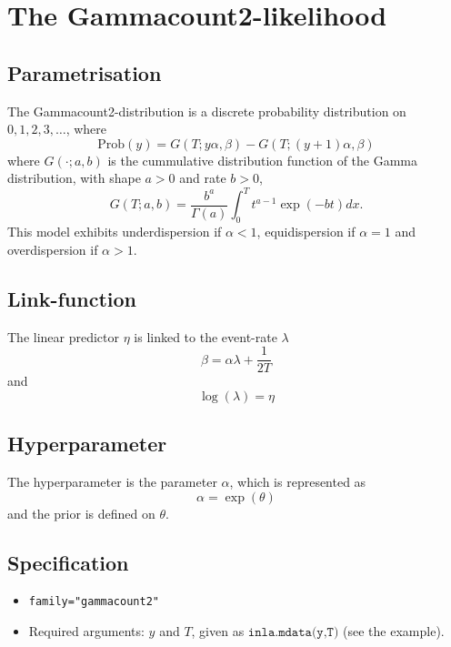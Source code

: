\documentclass[a4paper,11pt]{article}
\begin{document}
\section*{The Gammacount2-likelihood}

\subsection*{Parametrisation}

The Gammacount2-distribution is a discrete probability distribution on
$0, 1, 2, 3, \ldots$,  where
\begin{displaymath}
    \text{Prob}(y) = G(T; y\alpha, \beta) - G(T; (y+1)\alpha, \beta)
\end{displaymath}
where $G(\cdot; a, b)$ is the cummulative distribution function of the
Gamma distribution, with shape $a>0$ and rate $b>0$,
\begin{displaymath}
    G(T; a, b) = \frac{b^a}{\Gamma(a)} \int_0^{T} t^{a-1}\exp(-bt) dx.
\end{displaymath}
This model exhibits underdispersion if $\alpha < 1$,
equidispersion if $\alpha=1$ and overdispersion if $\alpha>1$.

\subsection*{Link-function}

The linear predictor $\eta$ is linked to the event-rate $\lambda$
\begin{displaymath}
    \beta = \alpha\lambda+ \frac{1}{2T}
\end{displaymath}
and 
\begin{displaymath}
    \log(\lambda) = \eta
\end{displaymath}

\subsection*{Hyperparameter}
The hyperparameter is the parameter $\alpha$, which is
represented as
\begin{displaymath}
    \alpha = \exp(\theta)
\end{displaymath}
and the prior is defined on $\theta$.

\subsection*{Specification}

\begin{itemize}
\item \texttt{family="gammacount2"}
\item Required arguments: $y$ and $T$, given  as
    $\texttt{inla.mdata(y,T)}$ (see the example).
\end{itemize}
\end{document}
